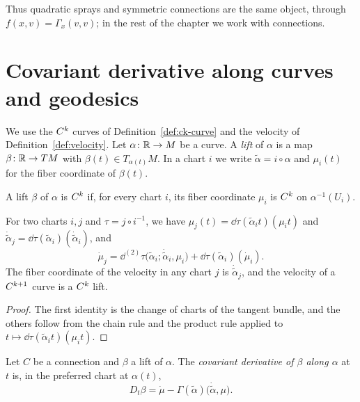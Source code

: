 Thus quadratic sprays and symmetric connections are the same object, through
$f(x, v) = \Gamma_x(v, v)$; in the rest of the chapter we work with connections.

\section{Covariant derivative along curves and geodesics}

We use the $C^{k}$ curves of Definition~\ref{def:ck-curve} and the velocity of
Definition~\ref{def:velocity}. Let $\alpha \colon \mathbb{R} \to M$ be a curve. A \emph{lift} of $\alpha$
is a map $\beta \colon \mathbb{R} \to TM$ with $\beta(t) \in T_{\alpha(t)} M$. In a chart $i$ we write
$\tilde\alpha = i \circ \alpha$ and $\mu_i(t)$ for the fiber coordinate of $\beta(t)$.

\begin{definition}
  \label{def:conn-lift}
  \leanok
  A lift $\beta$ of $\alpha$ is $C^{k}$ if, for every chart $i$, its fiber coordinate $\mu_i$ is
  $C^{k}$ on $\alpha^{-1}(U_i)$.
\end{definition}

\begin{lemma}
  \label{lem:conn-curve-transition}
  \leanok
  For two charts $i, j$ and $\tau = j \circ i^{-1}$, we have
  $\mu_j(t) = \dd\tau(\tilde\alpha_i t)(\mu_i t)$ and
  $\dot{\tilde\alpha}_j = \dd\tau(\tilde\alpha_i)(\dot{\tilde\alpha}_i)$, and
  \[
    \dot\mu_j = \dd^{(2)}\tau\bigl(\tilde\alpha_i; \dot{\tilde\alpha}_i, \mu_i\bigr)
      + \dd\tau(\tilde\alpha_i)(\dot\mu_i).
  \]
  The fiber coordinate of the velocity in any chart $j$ is $\dot{\tilde\alpha}_j$, and the
  velocity of a $C^{k+1}$ curve is a $C^{k}$ lift.
\end{lemma}

\begin{proof}
  \leanok
  The first identity is the change of charts of the tangent bundle, and the others follow from
  the chain rule and the product rule applied to $t \mapsto \dd\tau(\tilde\alpha_i t)(\mu_i t)$.
\end{proof}

\begin{definition}
  \label{def:cov-deriv-along}
  \leanok
  Let $C$ be a connection and $\beta$ a lift of $\alpha$. The \emph{covariant derivative of
  $\beta$ along $\alpha$} at $t$ is, in the preferred chart at $\alpha(t)$,
  \[
    D_t \beta = \dot\mu - \Gamma(\tilde\alpha)\bigl(\dot{\tilde\alpha}, \mu\bigr).
  \]
\end{definition}

